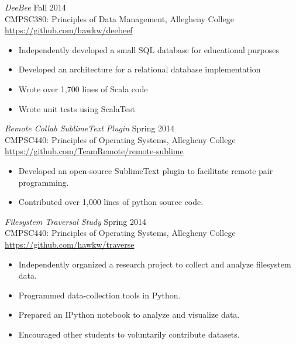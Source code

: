 \documentclass[margin]{res}
\begin{document}
\begin{resume}
		{\sl DeeBee} \hfill Fall 2014 \\
        		CMPSC380: Principles of Data Management, Allegheny College \\ 
		\url{https://github.com/hawkw/deebeef}
		\begin{itemize} \itemsep -2pt %
		\item Independently developed a small SQL database for educational purposes
		\item Developed an architecture for a relational database implementation
		\item Wrote over 1,700 lines of Scala code
		\item Wrote unit tests using ScalaTest
		\end{itemize}
		
		{\sl Remote Collab SublimeText Plugin } \hfill Spring 2014 \\
		CMPSC440: Principles of Operating Systems, Allegheny College \\
		\url{https://github.com/TeamRemote/remote-sublime}
		\begin{itemize}  \itemsep -2pt %
			\item Developed an open-source SublimeText plugin to facilitate remote pair programming.
			\item Contributed over 1,000 lines of python source code.
		\end{itemize}
		
                {\sl Filesystem Traversal Study} \hfill Spring 2014 \\ 
                CMPSC440: Principles of Operating Systems, Allegheny College \\
                \url{https://github.com/hawkw/traverse}
                 \begin{itemize} \itemsep -2pt %
                    \item Independently organized a research project to collect and analyze filesystem data.
                    \item Programmed data-collection tools in Python.
                    \item Prepared an IPython notebook to analyze and visualize data.
                    \item Encouraged other students to voluntarily contribute datasets.
                \end{itemize}


\end{resume}
\end{document}
